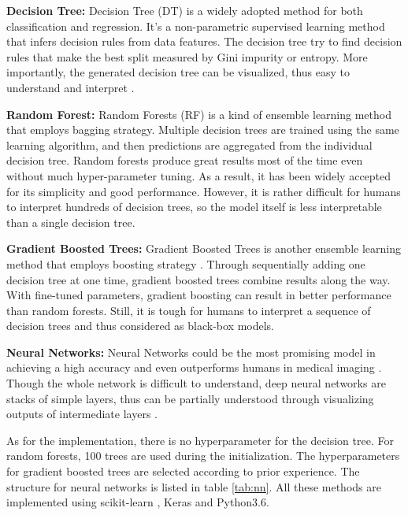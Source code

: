\textbf{Decision Tree:} Decision Tree (DT) is a widely adopted method for both classification and regression. It's a non-parametric supervised learning method that infers decision rules from data features. The decision tree try to find decision rules that make the best split measured by Gini impurity or entropy. More importantly, the generated decision tree can be visualized, thus easy to understand and interpret \citep{Breiman2015Classification}.

\textbf{Random Forest:} Random Forests (RF) is a kind of ensemble learning method \citep{Breiman2001Random} that employs bagging strategy. Multiple decision trees are trained using the same learning algorithm, and then predictions are aggregated from the individual decision tree. Random forests produce great results most of the time even without much hyper-parameter tuning. As a result, it has been widely accepted for its simplicity and good performance. However, it is rather difficult for humans to interpret hundreds of decision trees, so the model itself is less interpretable than a single decision tree.

\textbf{Gradient Boosted Trees:} Gradient Boosted Trees is another ensemble learning method that employs boosting strategy \citep{gbtrees}. Through sequentially adding one decision tree at one time, gradient boosted trees combine results along the way. With fine-tuned parameters, gradient boosting can result in better performance than random forests. Still, it is tough for humans to interpret a sequence of decision trees and thus considered as black-box models.

\textbf{Neural Networks:} Neural Networks could be the most promising model in achieving a high accuracy and even outperforms humans in medical imaging \citep{maier2018gentle}. Though the whole network is difficult to understand, deep neural networks are stacks of simple layers, thus can be partially understood through visualizing outputs of intermediate layers \citep{Montavon_2018}.


As for the implementation, there is no hyperparameter for the decision tree. For random forests, 100 trees are used during the initialization. The hyperparameters for gradient boosted trees are selected according to prior experience. The structure for neural networks is listed in table \ref{tab:nn}. All these methods are implemented using scikit-learn \citep{scikit-learn}, Keras and Python3.6.

